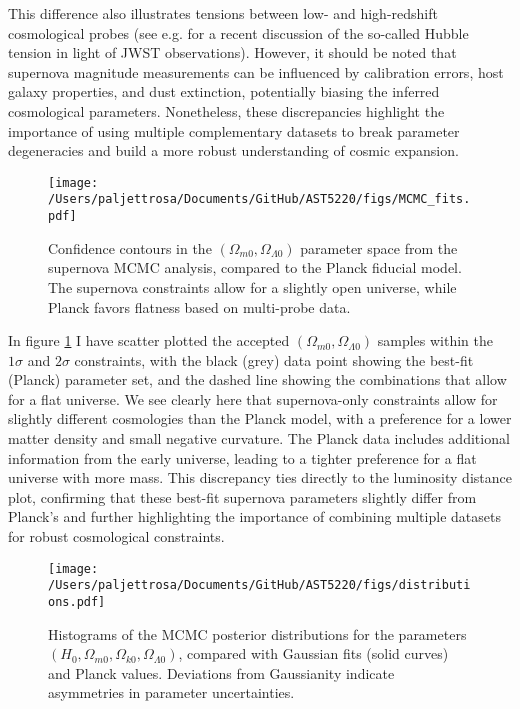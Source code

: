 \documentclass{aa}
\numberwithin{equation}{section}
\numberwithin{table}{section}
\numberwithin{figure}{section}
\begin{document}
This difference also illustrates tensions between low- and high-redshift cosmological probes (see e.g. \cite{JWST} for a recent discussion of the so-called Hubble tension in light of JWST observations). However, it should be noted that supernova magnitude measurements can be influenced by calibration errors, host galaxy properties, and dust extinction, potentially biasing the inferred cosmological parameters. Nonetheless, these discrepancies highlight the importance of using multiple complementary datasets to break parameter degeneracies and build a more robust understanding of cosmic expansion.


\begin{figure}
    \centering
    \texttt{[image: /Users/paljettrosa/Documents/GitHub/AST5220/figs/MCMC\_fits.pdf]}
    \caption{Confidence contours in the $(\Omega_{m0},\Omega_{\Lambda0})$ parameter space from the supernova MCMC analysis, compared to the Planck fiducial model. The supernova constraints allow for a slightly open universe, while Planck favors flatness based on multi-probe data.}\label{fig:MCMC fits}
\end{figure}

In figure \ref{fig:MCMC fits} I have scatter plotted the accepted $(\Omega_{m0},\Omega_{\Lambda0})$ samples within the $1\sigma$ and $2\sigma$ constraints, with the black (grey) data point showing the best-fit (Planck) parameter set, and the dashed line showing the combinations that allow for a flat universe. We see clearly here that supernova-only constraints allow for slightly different cosmologies than the Planck model, with a preference for a lower matter density and small negative curvature. The Planck data includes additional information from the early universe, leading to a tighter preference for a flat universe with more mass. This discrepancy ties directly to the luminosity distance plot, confirming that these best-fit supernova parameters slightly differ from Planck's and further highlighting the importance of combining multiple datasets for robust cosmological constraints.


\begin{figure*}
  \centering
  \texttt{[image: /Users/paljettrosa/Documents/GitHub/AST5220/figs/distributions.pdf]}
  \caption{Histograms of the MCMC posterior distributions for the parameters $(H_0,\Omega_{m0}, \Omega_{k0}, \Omega_{\Lambda0})$, compared with Gaussian fits (solid curves) and Planck values. Deviations from Gaussianity indicate asymmetries in parameter uncertainties.}\label{fig:distributions}
\end{figure*}
\end{document}
